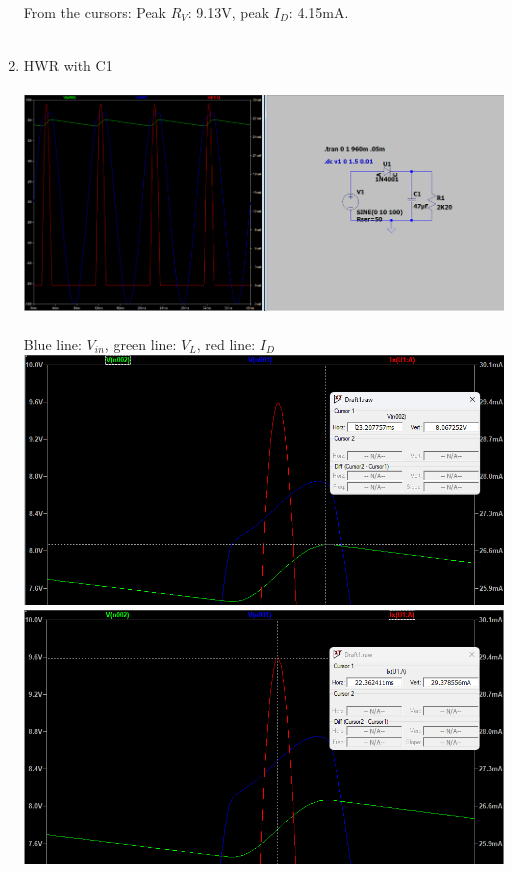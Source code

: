 \documentclass{article}
\begin{document}
\begin{enumerate}
				From the cursors: Peak \(R_V\): 9.13V, peak \(I_D\): 4.15mA.\\\\
				\item HWR with C1\\\\
				\includegraphics[scale=0.30]{prelab/problem 2 - 4}\\\\
				Blue line: \(V_{in}\), green line: \(V_L\), red line: \(I_D\)\\
				\includegraphics[scale=0.35]{prelab/problem 2 - 5}
				\includegraphics[scale=0.35]{prelab/problem 2 - 6}\\\\

\end{enumerate}
\end{document}
